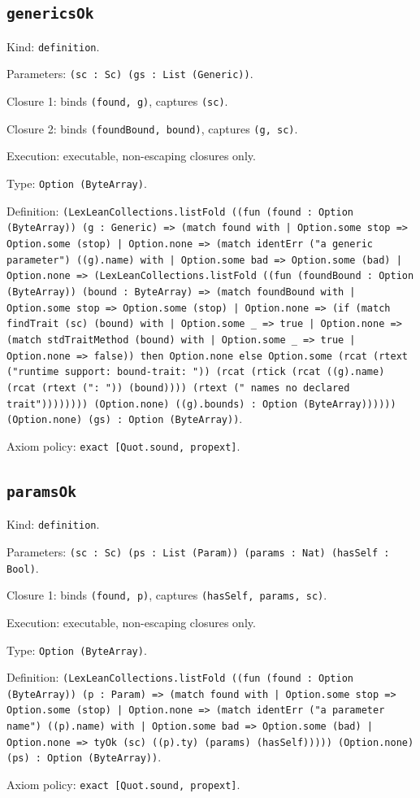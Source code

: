 \documentclass[11pt]{article}
\begin{document}
\subsection*{\texttt{genericsOk}}
\noindent Kind: \texttt{definition}.\par
\noindent Parameters: \texttt{(sc : Sc) (gs : List (Generic))}.\par
\noindent Closure 1: binds \texttt{(found, g)}, captures \texttt{(sc)}.\par
\noindent Closure 2: binds \texttt{(foundBound, bound)}, captures \texttt{(g, sc)}.\par
\noindent Execution: executable, non-escaping closures only.\par
\noindent Type: \texttt{Option (ByteArray)}.\par
\noindent Definition: \texttt{(LexLeanCollections.listFold ((fun (found : Option (ByteArray)) (g : Generic) => (match found with | Option.some stop => Option.some (stop) | Option.none => (match identErr ("a generic parameter") ((g).name) with | Option.some bad => Option.some (bad) | Option.none => (LexLeanCollections.listFold ((fun (foundBound : Option (ByteArray)) (bound : ByteArray) => (match foundBound with | Option.some stop => Option.some (stop) | Option.none => (if (match findTrait (sc) (bound) with | Option.some \_ => true | Option.none => (match stdTraitMethod (bound) with | Option.some \_ => true | Option.none => false)) then Option.none else Option.some (rcat (rtext ("runtime support: bound-trait: ")) (rcat (rtick (rcat ((g).name) (rcat (rtext (": ")) (bound)))) (rtext (" names no declared trait")))))))) (Option.none) ((g).bounds) : Option (ByteArray)))))) (Option.none) (gs) : Option (ByteArray))}.\par
\noindent Axiom policy: \texttt{exact [Quot.sound, propext]}.\par
\subsection*{\texttt{paramsOk}}
\noindent Kind: \texttt{definition}.\par
\noindent Parameters: \texttt{(sc : Sc) (ps : List (Param)) (params : Nat) (hasSelf : Bool)}.\par
\noindent Closure 1: binds \texttt{(found, p)}, captures \texttt{(hasSelf, params, sc)}.\par
\noindent Execution: executable, non-escaping closures only.\par
\noindent Type: \texttt{Option (ByteArray)}.\par
\noindent Definition: \texttt{(LexLeanCollections.listFold ((fun (found : Option (ByteArray)) (p : Param) => (match found with | Option.some stop => Option.some (stop) | Option.none => (match identErr ("a parameter name") ((p).name) with | Option.some bad => Option.some (bad) | Option.none => tyOk (sc) ((p).ty) (params) (hasSelf))))) (Option.none) (ps) : Option (ByteArray))}.\par
\noindent Axiom policy: \texttt{exact [Quot.sound, propext]}.\par
\end{document}
